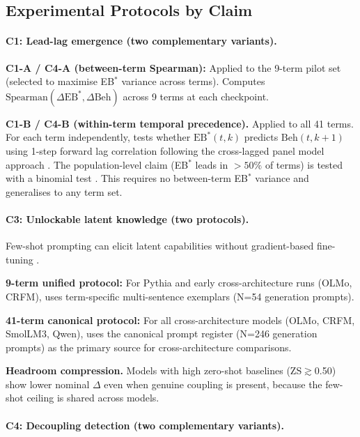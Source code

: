 \documentclass[10pt]{article} %
\begin{document}
\subsection{Experimental Protocols by Claim}

\paragraph{C1: Lead-lag emergence (two complementary variants).}

\textbf{C1-A / C4-A (between-term Spearman):} Applied to the 9-term pilot set (selected to maximise EB$^*$ variance across terms). Computes $\text{Spearman}(\Delta \text{EB}^*, \Delta \text{Beh})$ across 9 terms at each checkpoint.

\textbf{C1-B / C4-B (within-term temporal precedence).} Applied to all 41 terms. For each term independently, tests whether $\text{EB}^*(t, k)$ predicts $\text{Beh}(t, k+1)$ using 1-step forward lag correlation following the cross-lagged panel model approach \citep{hamaker2015critique}. The population-level claim (EB$^*$ leads in $>50\%$ of terms) is tested with a binomial test \citep{wilson1927probable}. This requires no between-term EB$^*$ variance and generalises to any term set.

\paragraph{C3: Unlockable latent knowledge (two protocols).}
Few-shot prompting can elicit latent capabilities without gradient-based fine-tuning \citep{brown2020language}.

\textbf{9-term unified protocol:} For Pythia and early cross-architecture runs (OLMo, CRFM), uses term-specific multi-sentence exemplars (N=54 generation prompts).

\textbf{41-term canonical protocol:} For all cross-architecture models (OLMo, CRFM, SmolLM3, Qwen), uses the canonical prompt register (N=246 generation prompts) as the primary source for cross-architecture comparisons.

\textbf{Headroom compression.} Models with high zero-shot baselines (ZS$\gtrsim$0.50) show lower nominal $\Delta$ even when genuine coupling is present, because the few-shot ceiling is shared across models.

\paragraph{C4: Decoupling detection (two complementary variants).}
\end{document}
